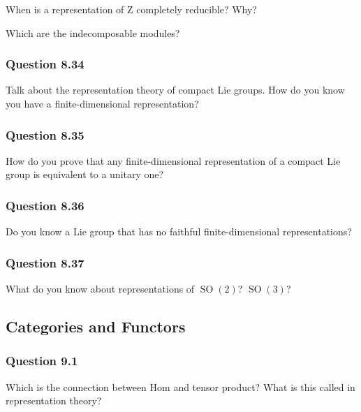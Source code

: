 When is a representation of Z completely reducible? Why?

Which are the indecomposable modules?

\hypertarget{question-8.34}{%
\subsubsection{Question 8.34}\label{question-8.34}}

Talk about the representation theory of compact Lie groups. How do you
know you have a finite-dimensional representation?

\hypertarget{question-8.35}{%
\subsubsection{Question 8.35}\label{question-8.35}}

How do you prove that any finite-dimensional representation of a compact
Lie group is equivalent to a unitary one?

\hypertarget{question-8.36}{%
\subsubsection{Question 8.36}\label{question-8.36}}

Do you know a Lie group that has no faithful finite-dimensional
representations?

\hypertarget{question-8.37}{%
\subsubsection{Question 8.37}\label{question-8.37}}

What do you know about representations of \({\operatorname{SO}}(2)\)?
\({\operatorname{SO}}(3)\)?

\hypertarget{categories-and-functors}{%
\subsection{Categories and Functors}\label{categories-and-functors}}

\hypertarget{question-9.1}{%
\subsubsection{Question 9.1}\label{question-9.1}}

Which is the connection between Hom and tensor product? What is this
called in representation theory?

